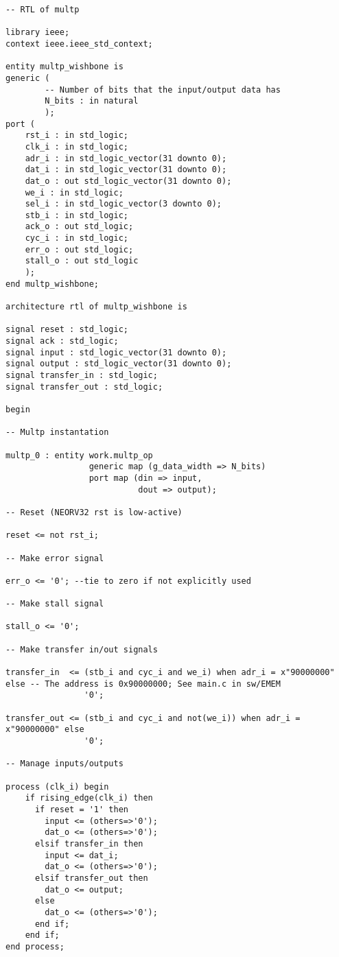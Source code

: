 \begin{code}
\begin{verbatim}
-- RTL of multp

library ieee;
context ieee.ieee_std_context;

entity multp_wishbone is
generic (  
        -- Number of bits that the input/output data has
        N_bits : in natural
        );
port (
    rst_i : in std_logic;
    clk_i : in std_logic;
    adr_i : in std_logic_vector(31 downto 0);
    dat_i : in std_logic_vector(31 downto 0);
    dat_o : out std_logic_vector(31 downto 0);
    we_i : in std_logic;
    sel_i : in std_logic_vector(3 downto 0);
    stb_i : in std_logic;
    ack_o : out std_logic;
    cyc_i : in std_logic;
    err_o : out std_logic;
    stall_o : out std_logic
    );
end multp_wishbone;

architecture rtl of multp_wishbone is

signal reset : std_logic;
signal ack : std_logic;
signal input : std_logic_vector(31 downto 0);
signal output : std_logic_vector(31 downto 0);
signal transfer_in : std_logic;
signal transfer_out : std_logic;

begin

-- Multp instantation

multp_0 : entity work.multp_op
                 generic map (g_data_width => N_bits)
                 port map (din => input,
                           dout => output);

-- Reset (NEORV32 rst is low-active)

reset <= not rst_i;

-- Make error signal

err_o <= '0'; --tie to zero if not explicitly used

-- Make stall signal

stall_o <= '0';

-- Make transfer in/out signals

transfer_in  <= (stb_i and cyc_i and we_i) when adr_i = x"90000000" else -- The address is 0x90000000; See main.c in sw/EMEM
                '0';

transfer_out <= (stb_i and cyc_i and not(we_i)) when adr_i = x"90000000" else
                '0';

-- Manage inputs/outputs

process (clk_i) begin
    if rising_edge(clk_i) then
      if reset = '1' then
        input <= (others=>'0');
        dat_o <= (others=>'0');
      elsif transfer_in then
        input <= dat_i;
        dat_o <= (others=>'0');
      elsif transfer_out then
        dat_o <= output;
      else
        dat_o <= (others=>'0');
      end if;
    end if;
end process;


\end{verbatim}
\end{code}
